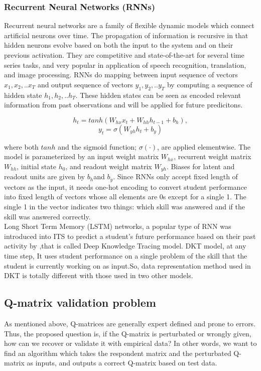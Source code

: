 \documentclass[12pt]{article}
\begin{document}
\subsubsection{Recurrent Neural Networks (RNNs)}
 Recurrent neural networks are a family of flexible dynamic models which connect artificial neurons over time. The propagation of information is recursive in that hidden neurons evolve based on both the input to the system and on their previous activation\cite{williams1989learning}. They are competitive and state-of-the-art for several time series tasks, and very popular in application of speech recognition, translation, and image processing. RNNs do mapping between input sequence of vectors $x_1,x_2,..x_T$ and output sequence of vectors $y_1,y_2,..y_T$ by computing a sequence of hidden state $h_1,h_2,..h_T$. These hidden states can be seen as encoded relevant information from past observations and will be applied for future predicitons. 
 
 $$h_t = tanh (W_{hx} x_t + W_{hh} h_{t-1} + b_h),$$
 $$ y_t= \sigma (W_{yh} h_t + b_y)$$

where both $tanh$ and the sigmoid function; $\sigma ( \cdotp) $, are applied elementwise. The model is parameterized by an input weight matrix $W_{hx}$, recurrent weight matrix $W_{hh}$, initial state $h_0$, and readout weight matrix $W_{yh}$. Biases for latent and readout units are given by $b_h $and $b_y$. Since RNNs only accept fixed
length of vectors as the input, it needs one-hot encoding to convert student performance into fixed length of vectors whose all elements are 0s except for a single 1. The single 1 in the vector indicates two things: which skill was answered and if the skill was
answered correctly.\\
 Long Short Term Memory (LSTM) networks, a popular type of RNN was introduced into ITS to predict a student's future performance based on
their past activity by \cite{piech2015deep},that is called Deep Knowledge Tracing model. DKT model, at any time step, It uses student performance on a single problem of the skill that the student is currently working on as input.So, data representation method used in DKT is totally different with those used in two other models.   
  
  
 
\subsection{Q-matrix validation problem}
As mentioned above, Q-matrices are generally expert defined and prone to errors. Thus, the proposed question is, if the Q-matrix is perturbated or wrongly given, how can we recover or validate it with empirical data? In other words, we want to find an algorithm which takes the respondent matrix and the perturbated Q-matrix as inputs, and outputs a correct Q-matrix based on test data.
\end{document}
